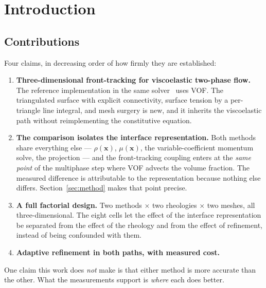 \section{Introduction}
\label{sec:intro}



\subsection*{Contributions}

Four claims, in decreasing order of how firmly they are established:

\begin{enumerate}
\item \textbf{Three-dimensional front-tracking for viscoelastic two-phase
flow.} The reference implementation in the same solver~\cite{silva-thesis} uses
VOF. The triangulated surface with explicit connectivity, surface tension by a
per-triangle line integral, and mesh surgery is new, and it inherits the
viscoelastic path without reimplementing the constitutive equation.

\item \textbf{The comparison isolates the interface representation.} Both
methods share everything else --- $\rho(\mathbf{x})$, $\mu(\mathbf{x})$, the
variable-coefficient momentum solve, the projection --- and the front-tracking
coupling enters at the \emph{same point} of the multiphase step where VOF
advects the volume fraction. The measured difference is attributable to the
representation because nothing else differs. Section~\ref{sec:method} makes
that point precise.

\item \textbf{A full factorial design.} Two methods $\times$ two rheologies
$\times$ two meshes, all three-dimensional. The eight cells let the effect of
the interface representation be separated from the effect of the rheology and
from the effect of refinement, instead of being confounded with them.

\item \textbf{Adaptive refinement in both paths, with measured cost.}
\end{enumerate}

\noindent
One claim this work does \emph{not} make is that either method is more accurate
than the other. What the measurements support is \emph{where} each does better.
